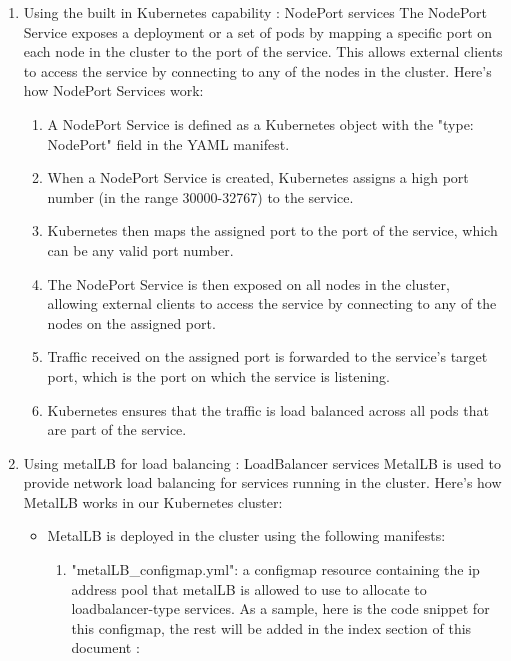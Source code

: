\begin{enumerate}[label = (\alph*)]

\item Using the built in Kubernetes capability : NodePort services 
The NodePort Service exposes a deployment or a set of pods by mapping a specific port on each node in the cluster to the port of the service. 
This allows external clients to access the service by connecting to any of the nodes in the cluster. 
Here's how NodePort Services work: 
    \begin{enumerate}[label = (\arabic*)]
    \item A NodePort Service is defined as a Kubernetes object with the           "type: NodePort" field in the YAML manifest. 
    \item When a NodePort Service is created, Kubernetes assigns a high port number (in the range 30000-32767) to the service. 
    \item Kubernetes then maps the assigned port to the port of the service, which can be any valid port number. 
    \item The NodePort Service is then exposed on all nodes in the cluster, allowing external clients to access the service by connecting to any of the nodes on the assigned port. 
    \item Traffic received on the assigned port is forwarded to the service's target port, which is the port on which the service is listening. 
    \item Kubernetes ensures that the traffic is load balanced across all pods that are part of the service. 
    \end{enumerate}

\item Using metalLB for load balancing : LoadBalancer services 
MetalLB is used to provide network load balancing for services running in the cluster. Here's how MetalLB works in our Kubernetes cluster: 

    \begin{itemize}[label={--}]
        \item MetalLB is deployed in the cluster using the following manifests: 
            \begin{enumerate}[label = (\arabic*)]
            \item "metalLB\_configmap.yml": a configmap resource containing the ip address pool that metalLB is allowed to use to allocate to loadbalancer-type services. As a sample, here is the code snippet for this configmap, the rest will be added in the index section of this document : 


\end{enumerate}
\end{itemize}
\end{enumerate}
